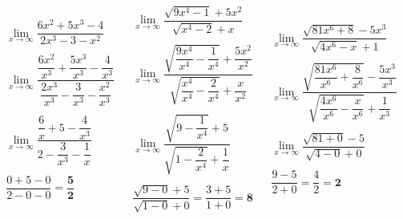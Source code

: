 \documentclass[12pt]{article}
\begin{document}
\begin{center}
\[
\begin{array}{c|c|c}
  \begin{array}{c}
    \lim_{x \to \infty} \dfrac{6x^2 + 5x^3 - 4}{2x^3 - 3 - x^2} \\\\
    \lim_{x \to \infty} \dfrac{\dfrac{6x^2}{x^3} + \dfrac{5x^3}{x^3} - \dfrac{4}{x^3}}
                              {\dfrac{2x^3}{x^3} - \dfrac{3}{x^3} - \dfrac{x^2}{x^3}} \\\\
    \lim_{x \to \infty} \dfrac{\dfrac{6}{x} + 5 - \dfrac{4}{x^3}}
                              {2 - \dfrac{3}{x^3} - \dfrac{1}{x}} \\\\
    \dfrac{0 + 5 - 0}{2 - 0 - 0} = \mathbf{\dfrac{5}{2}}
  \end{array}
  &
  \begin{array}{c}
    \lim_{x \to \infty} \dfrac{\sqrt{9x^4-1}+5x^2}{\sqrt{x^4-2}+x} \\\\
    \lim_{x \to \infty} \dfrac{\sqrt{\dfrac{9x^4}{x^4} - \dfrac{1}{x^4}} + \dfrac{5x^2}{x^2}}
                              {\sqrt{\dfrac{x^4}{x^4} - \dfrac{2}{x^4}} + \dfrac{x}{x^2}} \\\\
    \lim_{x \to \infty} \dfrac{\sqrt{9 - \dfrac{1}{x^4}} + 5}
                              {\sqrt{1 - \dfrac{2}{x^4}} + \dfrac{1}{x}} \\\\
    \dfrac{\sqrt{9 - 0} + 5}{\sqrt{1 - 0} + 0} = \dfrac{3 + 5}{1 + 0} = \mathbf{8}
  \end{array}
  &
  \begin{array}{c}
    \lim_{x \to \infty} \dfrac{\sqrt{81x^6 + 8} - 5x^3}{\sqrt{4x^6 -x} + 1} \\\\
    \lim_{x \to \infty} \dfrac{\sqrt{\dfrac{81x^6}{x^6} + \dfrac{8}{x^6}} - \dfrac{5x^3}{x^3}}
                              {\sqrt{\dfrac{4x^6}{x^6} - \dfrac{x}{x^6}} + \dfrac{1}{x^3}} \\\\
    \lim_{x \to \infty} \dfrac{\sqrt{81 + 0} - 5}
                              {\sqrt{4 - 0} + 0} \\\\
    \dfrac{9 - 5}{2 + 0} = \dfrac{4}{2} = \mathbf{2}
  \end{array}
\end{array}
\]
\end{center}
\end{document}
